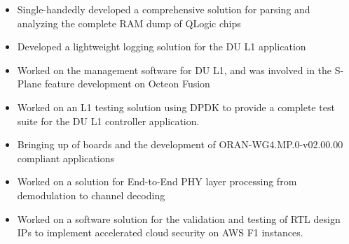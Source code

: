 \documentclass[10pt, letterpaper]{altacv}
\begin{document}
\begin{itemize}
\item Single-handedly developed a comprehensive solution for parsing and analyzing the complete RAM dump of QLogic chips
\end{itemize}
\begin{itemize}
\item Developed a lightweight logging solution for the DU L1 application
\end{itemize}
\begin{itemize}
\item Worked on the management software for DU L1, and was involved in the S-Plane feature development on Octeon Fusion
\end{itemize}
\begin{itemize}
\item Worked on an L1 testing solution using DPDK to provide a complete test suite for the DU L1 controller application.
\end{itemize}
\begin{itemize}
\item Bringing up of boards and the development of ORAN-WG4.MP.0-v02.00.00 compliant applications
\end{itemize}
\begin{itemize}
\item Worked on a solution for End-to-End PHY layer processing from demodulation to channel decoding
\end{itemize}
\begin{itemize}
\item Worked on a software solution for the validation and testing of RTL design IPs to implement accelerated cloud security on AWS F1 instances.
\end{itemize}
\end{document}
